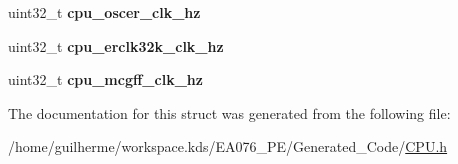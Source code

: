 \begin{DoxyCompactItemize}
uint32\+\_\+t {\bfseries cpu\+\_\+oscer\+\_\+clk\+\_\+hz}
\item 
\mbox{\label{struct_t_cpu_clock_configuration_a3f68e3893f7dec551e938a909929687b}} 
uint32\+\_\+t {\bfseries cpu\+\_\+erclk32k\+\_\+clk\+\_\+hz}
\item 
\mbox{\label{struct_t_cpu_clock_configuration_a5bd9b1235d0f85073ed01c126782d898}} 
uint32\+\_\+t {\bfseries cpu\+\_\+mcgff\+\_\+clk\+\_\+hz}
\end{DoxyCompactItemize}


The documentation for this struct was generated from the following file\+:\begin{DoxyCompactItemize}
\item 
/home/guilherme/workspace.\+kds/\+E\+A076\+\_\+\+P\+E/\+Generated\+\_\+\+Code/\hyperlink{_c_p_u_8h}{C\+P\+U.\+h}\end{DoxyCompactItemize}
